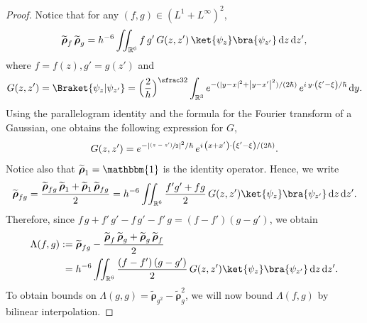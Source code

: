 \documentclass[JEP,XML,SOM,Unicode,NoEqCountersInSection,published]{cedram}
\newcommand{\psfrac}[2]{\sfrac{(#1)}{#2}}
\newcommand {\an}[1] {\lvert #1\rvert}
\let\mathds\mathbbm
\theoremstyle{definition}
\newcommand {\RR} {\mathbb R}
\newcommand {\Rd} {\RR^3}
\newcommand {\RRd} {\RR^6}
\let\lt\left
\let\rt\right
\renewcommand {\(} {\lt(}
\renewcommand {\)} {\rt)}
\newcommand {\n}[1] {\lt\lvert #1 \rt\rvert}
\renewcommand {\d} {\mathop{}\!\mathrm{d}}
\newcommand {\intd} {\int_{\Rd}}
\newcommand {\iintd} {\iint_{\RRd}}
\newcommand {\Inprod}[2] {\Braket{#1 | #2}}
\newcommand {\op} {\boldsymbol{\rho}}
\begin{document}
\begin{proof}
Notice that for any $(f,g)\in (L^1+ L^\infty)^2$,
\begin{equation*}
\widetilde{\op}_{f}\,\widetilde{\op}_{g} = h^{-6} \iintd f\,g' \,G(z,z') \, \ket{\psi_{z}}\bra{\psi_{z'}} \d z \d z',
\end{equation*}
where $f = f(z), g' = g(z')$ and
\begin{equation*}
G(z,z') = \Inprod{\psi_z}{\psi_{z'}} = \Bigl(\frac{2}{h}\Bigr)^{\sfrac32} \intd e^{-(\n{y-x}^2+\n{y-x'}^2)/(2\hbar)}\, e^{i\,y\cdot\(\xi'-\xi\)/\hbar} \d y.
\end{equation*}
Using the parallelogram identity and the formula for the Fourier transform of a Gaussian, one obtains the following expression for $G$,
\begin{equation*}
G(z,z')
= e^{-\an{\psfrac{z-z'}{2}}^2/\hbar}\, e^{i\,\(x+x'\)\cdot\(\xi'-\xi\)/(2\hbar)}.
\end{equation*}
Notice also that $\widetilde{\op}_1 = \mathds{1}$ is the identity operator. Hence, we write
\[
\widetilde{\op}_{fg} = \frac{\widetilde{\op}_{fg}\, \widetilde{\op}_1 + \widetilde{\op}_1\, \widetilde{\op}_{fg}}{2} = h^{-6} \iintd \frac{f'g'+fg}{2} \,G(z,z') \ket{\psi_{z}}\bra{\psi_{z'}} \d z \d z'.
\]
Therefore, since $f\,g + f'\,g' - f\,g' - f'\,g = \(f-f'\) \(g-g'\)$, we obtain
\begin{align*}
\Lambda(f,g) &:= \widetilde{\op}_{fg} - \frac{\widetilde{\op}_f\,\widetilde{\op}_g + \widetilde{\op}_g\,\widetilde{\op}_f}{2}
\\
&\hphantom{:}= h^{-6} \iintd \frac{\(f-f'\)\(g-g'\)}{2} \,G(z,z') \ket{\psi_{z}}\bra{\psi_{z'}} \d z \d z'.
\end{align*}
To obtain bounds on $\Lambda(g,g) = \widetilde{\op}_{g^2} - \widetilde{\op}_g^2$, we will now bound $\Lambda(f,g)$ by bilinear interpolation.


\end{proof}
\end{document}

